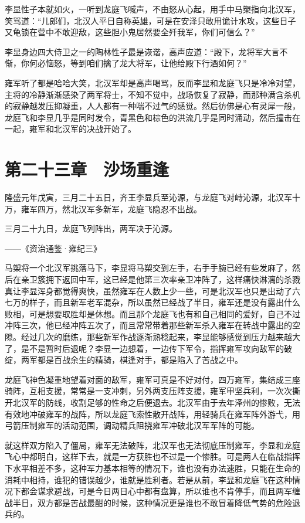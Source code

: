 李显性子本就如火，一听到龙庭飞喊声，不由怒从心起，用手中马槊指向北汉军，笑骂道：“儿郎们，北汉人平日自称英雄，可是在安泽只敢用诡计水攻，这些日子又龟锁在营中不敢迎敌，这些胆小鬼居然要全歼我军，你们可信么？”

李显身边四大侍卫之一的陶林性子最是诙谐，高声应道：“殿下，龙将军大言不惭，你何必恼怒，等到咱们擒了龙大将军，让他给殿下行酒如何？”

雍军听了都是哈哈大笑，北汉军却是高声喝骂，反而李显和龙庭飞只是冷冷对望，主将的冷静渐渐感染了两军将士，不知不觉中，战场恢复了寂静，而那种满含杀机的寂静越发压抑凝重，人人都有一种喘不过气的感觉。然后彷佛是心有灵犀一般，龙庭飞和李显几乎是同时发令，青黑色和棕色的洪流几乎是同时涌动，然后撞击在一起，雍军和北汉军的决战开始了。

\chapter{第二十三章　沙场重逢}

隆盛元年戊寅，三月二十五日，齐王李显兵至沁源，与龙庭飞对峙沁源，北汉军十万，雍军四万，然北汉军多新军，龙庭飞隐忍不出战。

三月二十九日，龙庭飞列阵出，两军决于沁源。

——《资治通鉴·雍纪三》

马槊将一个北汉军挑落马下，李显将马槊交到左手，右手手腕已经有些发麻了，然后在亲卫簇拥下返回中军，这已经是他第三次率亲卫冲阵了，这样痛快淋漓的杀戮真让李显浑身都觉得爽快，虽然雍军在人数上少一些，可是北汉军也只是出动了六七万的样子，而且新军老军混杂，所以虽然已经战了半日，雍军还是没有露出什么败相，可是想要取胜却是休想。而且那个龙庭飞也有和自己相同的爱好，自己不过冲阵三次，他已经冲阵五次了，而且常常带着那些新军杀入雍军在转战中露出的空隙。经过几次的磨练，那些新军作战逐渐熟稔起来，李显能够感觉到压力越来越大了，是不是暂时后退呢？李显一边想着，一边传下军令，指挥雍军攻向敌军的破绽，两军都是百战余生的精骑，棋逢对手，都是陷入了苦战之中。

龙庭飞神色凝重地望着对面的敌军，雍军可真是不好对付，四万雍军，集结成三座骑阵，互相支援，常常是一支冲刺，另外两支压阵支援，雍军甲坚兵利，一次次撕开北汉军的防线，收割足够的性命之后便退去。北汉军由于去年泽州的惨败，无法有效地冲破雍军的战阵，所以龙庭飞索性散开战阵，用轻骑兵在雍军阵外游弋，用弓箭压制雍军的活动范围，调动精兵阻挠雍军冲破北汉军军阵的可能。

就这样双方陷入了僵局，雍军无法破阵，北汉军也无法彻底压制雍军，李显和龙庭飞心中都明白，这样下去，就是一方获胜也不过是一个惨胜。可是两人在临战指挥下水平相差不多，这种军力基本相等的情况下，谁也没有办法速胜，只能在生命的消耗中相持，谁犯的错误越少，谁就是胜利者。若是从前，李显和龙庭飞在这种情况下都会谋求避战，可是今日两日心中都有盘算，所以谁也不肯停手，而且两军缠战半日，双方都是苦战最酣的时候，这种情况更是谁也不敢冒着降低气势的危险退兵的。

